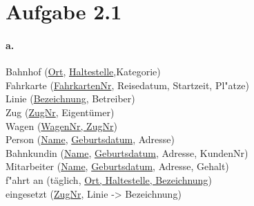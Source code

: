 \documentclass[12pt]{article}
\begin{document}
 	
 	
 	
 	
 	\section*{Aufgabe 2.1}
 	
 	
 	
 	\paragraph*{a.}
	 	Bahnhof (\underline{Ort}, \underline{Haltestelle},Kategorie)\\[1.3em]
	 	
	 	Fahrkarte (\underline{FahrkartenNr}, Reisedatum, Startzeit, Pl"atze)\\[1.3em]
	 	
	 	Linie (\underline{Bezeichnung}, Betreiber)\\[1.3em]
	 	
	 	Zug (\underline{ZugNr}, Eigentümer)\\[1.3em]
	 	
	 	Wagen (\underline{WagenNr, ZugNr})\\[1.3em]
	 	
	 	Person (\underline{Name}, \underline{Geburtsdatum}, Adresse) \\[1,3em]
	 	
	 	Bahnkundin (\underline{Name}, \underline{Geburtsdatum}, Adresse, KundenNr)\\[1,3em]
	 	
	 	Mitarbeiter (\underline{Name}, \underline{Geburtsdatum},  Adresse, Gehalt)\\[1,3em]
	 	
	 	f"ahrt an (täglich, \underline{Ort, Haltestelle, Bezeichnung})\\[1,3em]
	 	
	 	eingesetzt (\underline{ZugNr}, Linie -> Bezeichnung)\\[1,3em]
	 	
\end{document}
